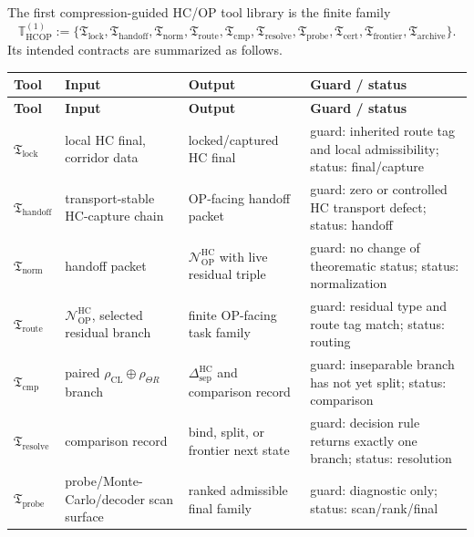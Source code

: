 \begin{definition}
\label{def:first-extracted-hcop-tool-library}
The first compression-guided HC/OP tool library is the finite family
\[
 \mathbb T_{\mathrm{HCOP}}^{(1)}
 :=
 \{
 \mathfrak T_{\mathrm{lock}},
 \mathfrak T_{\mathrm{handoff}},
 \mathfrak T_{\mathrm{norm}},
 \mathfrak T_{\mathrm{route}},
 \mathfrak T_{\mathrm{cmp}},
 \mathfrak T_{\mathrm{resolve}},
 \mathfrak T_{\mathrm{probe}},
 \mathfrak T_{\mathrm{cert}},
 \mathfrak T_{\mathrm{frontier}},
 \mathfrak T_{\mathrm{archive}}
 \}.
\]
Its intended contracts are summarized as follows.

{\small
\renewcommand{\arraystretch}{1.18}
\begin{longtable}{|P{0.18\textwidth}|P{0.22\textwidth}|P{0.22\textwidth}|P{0.26\textwidth}|}
\hline
\textbf{Tool} & \textbf{Input} & \textbf{Output} & \textbf{Guard / status} \\
\hline
\endfirsthead
\hline
\textbf{Tool} & \textbf{Input} & \textbf{Output} & \textbf{Guard / status} \\
\hline
\endhead
\(\mathfrak T_{\mathrm{lock}}\) & local HC final, corridor data & locked/captured HC final & guard: inherited route tag and local admissibility; status: final/capture \\
\hline
\(\mathfrak T_{\mathrm{handoff}}\) & transport-stable HC-capture chain & OP-facing handoff packet & guard: zero or controlled HC transport defect; status: handoff \\
\hline
\(\mathfrak T_{\mathrm{norm}}\) & handoff packet & \(\mathcal N_{\mathrm{OP}}^{\mathrm{HC}}\) with live residual triple & guard: no change of theorematic status; status: normalization \\
\hline
\(\mathfrak T_{\mathrm{route}}\) & \(\mathcal N_{\mathrm{OP}}^{\mathrm{HC}}\), selected residual branch & finite OP-facing task family & guard: residual type and route tag match; status: routing \\
\hline
\(\mathfrak T_{\mathrm{cmp}}\) & paired \(\rho_{\mathrm{CL}}\oplus\rho_{\Theta R}\) branch & \(\Delta_{\mathrm{sep}}^{\mathrm{HC}}\) and comparison record & guard: inseparable branch has not yet split; status: comparison \\
\hline
\(\mathfrak T_{\mathrm{resolve}}\) & comparison record & bind, split, or frontier next state & guard: decision rule returns exactly one branch; status: resolution \\
\hline
\(\mathfrak T_{\mathrm{probe}}\) & probe/Monte-Carlo/decoder scan surface & ranked admissible final family & guard: diagnostic only; status: scan/rank/final \\

\end{longtable}}
\end{definition}
